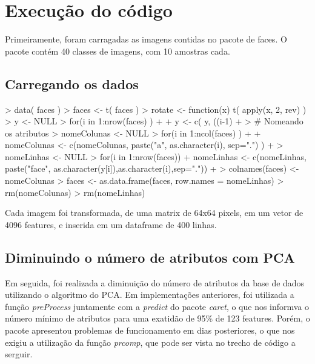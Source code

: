 \documentclass[12pt,a4paper,titlepage]{article}
\begin{document}
\section{Execução do código}

Primeiramente, foram carragadas as imagens contidas no pacote de faces. O pacote contém 40 classes de imagens, com 10 amostras cada.

\subsection{Carregando os dados}

\begin{Schunk}
\begin{Sinput}
> data( faces )
> faces <- t( faces )
> rotate <- function(x) t( apply(x, 2, rev) )
> y <- NULL
> for(i in 1:nrow(faces) )
+ {
+     y <- c( y, ((i-1) %/% 10) + 1 )
+ }
> # Nomeando os atributos
> nomeColunas <- NULL
> for(i in 1:ncol(faces) )
+ {
+     nomeColunas <- c(nomeColunas, paste("a", as.character(i), sep=".") )
+ }
> nomeLinhas <- NULL
> for(i in 1:nrow(faces)) {
+     nomeLinhas <- c(nomeLinhas, paste("face", as.character(y[i]),as.character(i),sep="."))
+ }
> colnames(faces) <- nomeColunas
> faces <- as.data.frame(faces, row.names = nomeLinhas)
> rm(nomeColunas)
> rm(nomeLinhas)
\end{Sinput}
\end{Schunk}

Cada imagem foi transformada, de uma matrix de 64x64 pixels, em um vetor de 4096 features, e inserida em um dataframe de 400 linhas.

\subsection{Diminuindo o número de atributos com PCA}

Em seguida, foi realizada a diminuição do número de atributos da base de dados utilizando o algoritmo do PCA. Em implementações anteriores, foi utilizada a função \textit{preProcess} juntamente com a \textit{predict} do pacote \textit{caret}, o que nos informva o número mínimo de atributos para uma exatidão de 95\% de 123 features. Porém, o pacote apresentou problemas de funcionamento em dias posteriores, o que nos exigiu a utilização da função \textit{prcomp}, que pode ser vista no trecho de código a serguir.


\begin{Schunk}
\end{Schunk}
\end{document}
